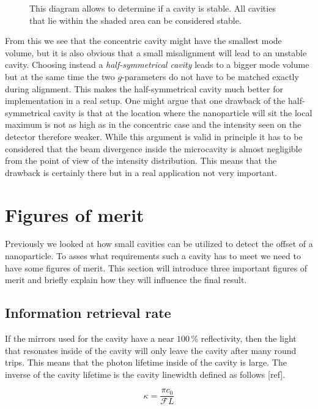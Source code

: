 \begin{figure}[H]
	
	\caption{This diagram allows to determine if a cavity is stable. All cavities that lie within the shaded area can be considered stable.}
	\label{fig:CavityStabilityDiagram}
\end{figure}

From this we see that the concentric cavity might have the smallest mode volume, but it is also obvious that a small misalignment will lead to an unstable cavity. Choosing instead a \textit{half-symmetrical cavity} leads to a bigger mode volume but at the same time the two $g$-parameters do not have to be matched exactly during alignment. This makes the half-symmetrical cavity much better for implementation in a real setup. One might argue that one drawback of the half-symmetrical cavity is that at the location where the nanoparticle will sit the local maximum is not as high as in the concentric case and the intensity seen on the detector therefore weaker. While this argument is valid in principle it has to be considered that the beam divergence inside the microcavity is almost negligible from the point of view of the intensity distribution. This means that the drawback is certainly there but in a real application not very important.

\section{Figures of merit}
Previously we looked at how small cavities can be utilized to detect the offset of a nanoparticle. To asses what requirements such a cavity has to meet we need to have some figures of merit. This section will introduce three important figures of merit and briefly explain how they will influence the final result.

\subsection{Information retrieval rate}\label{ChapInformationRetrievalRate}
If the mirrors used for the cavity have a near $100\,\%$ reflectivity, then the light that resonates inside of the cavity will only leave the cavity after many round trips. This means that the photon lifetime inside of the cavity is large. The inverse of the cavity lifetime is the cavity linewidth defined as follows [ref].

\begin{equation}
	\kappa = \frac{\pi c_0}{\mathcal{F}L}
\end{equation}

